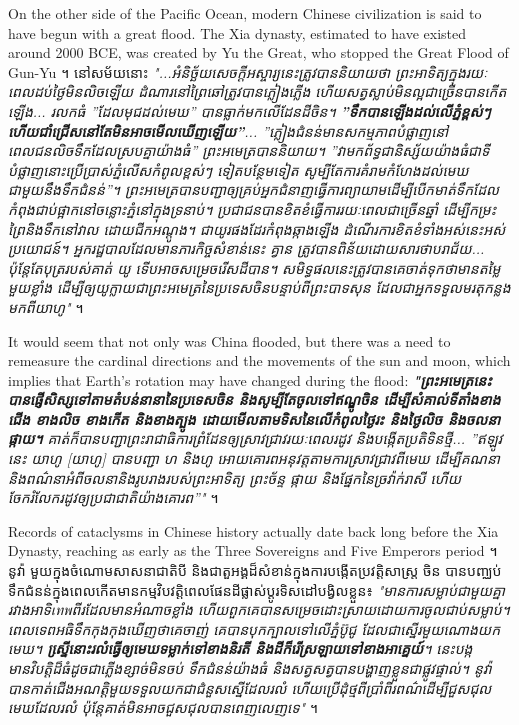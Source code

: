 \documentclass[10pt,twocolumn,letterpaper]{article}
\begin{document}
On the other side of the Pacific Ocean, modern Chinese civilization is said to have begun with a great flood. The Xia dynasty, estimated to have existed around 2000 BCE, was created by Yu the Great, who stopped the Great Flood of Gun-Yu \cite{6}។ នៅសម័យនោះ \textit{"...អំនិច្ឆ័យសេចក្ដីអស្ចារ្យនេះត្រូវបាននិយាយថា ព្រះអាទិត្យក្នុងរយៈពេលដប់ថ្ងៃមិនលិចឡើយ ដំណារ​នៅព្រៃឆៅត្រូវបានភ្លៀងភ្លើង ហើយសត្វស្លាប់មិនល្អជាច្រើនបានកើតឡើង... រលកធំ ''ដែលមុជដល់មេឃ'' បានធ្លាក់មកលើដែនដីចិន។ \textbf{''ទឹកបានឡើងដល់លើភ្នំខ្ពស់ៗ ហើយជាំជ្រើសនៅតែមិនអាចមើលឃើញឡើយ''}... ''ភ្លៀងជំនន់មានសកម្មភាពបំផ្លាញនៅពេលជនលិច​ទឹកដែលស្របគ្នាយ៉ាងធំ'' ព្រះអមេត្របាននិយាយ។ ''វាមកព័ទ្ធជានិស្ស័យយ៉ាងធំជាទីបំផ្លាញនោះប្រើប្រាស់ភ្នំលើសកំពូលខ្ពស់ៗ ទៀតបន្ថែមទៀត សូម្បីតែការគំរាមកំហែងដល់មេឃជាមួយនឹងទឹកជំនន់''។ ព្រះអមេត្របានបញ្ជាឲ្យគ្រប់អ្នកជំនាញធ្វើការព្យាយាមដើម្បីបើកមាត់ទឹកដែលកំពុងជាប់ផ្អាកនៅចន្លោះភ្នំនៅក្នុងទ្រនាប់។ ប្រជាជនបានខិតខំធ្វើការរយៈពេលជាច្រើនឆ្នាំ ដើម្បីកម្រះព្រៃនិងទឹកនៅវាល ដោយជីកអណ្តូង។ ជាយូរផងដែរកំពុងឆ្កាងឡើង ដំណើរការខិតខំទាំងអស់នេះអស់ប្រយោជន៍។ អ្នករដ្ឋបាលដែលមានភារកិច្ចសំខាន់នេះ គ្វាន ត្រូវបានពិន័យដោយសារថា​បរាជ័យ... ប៉ុន្តែតែបុត្ររបស់គាត់ យូ ទើបអាចសម្រេចរើសដីបាន។ សមិទ្ធផលនេះត្រូវបានគេចាត់ទុកថាមានតម្លៃមួយខ្លាំង ដើម្បីឲ្យយូក្លាយជាព្រះអមេត្រនៃប្រទេសចិនបន្ទាប់ពីព្រះបាទសុន ដែលជាអ្នកទទួលមរតុកន្លងមកពីយាហូ"} \cite{5}។

It would seem that not only was China flooded, but there was a need to remeasure the cardinal directions and the movements of the sun and moon, which implies that Earth's rotation may have changed during the flood: \textit{\textbf{"ព្រះអមេត្រនេះបានផ្ញើសិស្សទៅតាមតំបន់នានានៃប្រទេសចិន និងសូម្បីតែចូលទៅឥណ្ឌូចិន ដើម្បីសំគាល់ទីតាំងខាងជើង ខាងលិច ខាងកើត និងខាងត្បូង ដោយមើលតាមទិសនៃលើកំពូលថ្ងៃរះ និងថ្ងៃលិច និងចលនាផ្កាយ។} គាត់ក៏បានបញ្ជាព្រះរាជាធិការព្រំដែនឲ្យស្រាវជ្រាវរយៈពេលរដូវ និងបង្កើតប្រតិទិនថ្មី... ''ឥឡូវនេះ យាហូ [យាហូ] បានបញ្ជា ហ និងហូ អោយគោរពអនុវត្តតាមការស្រាវជ្រាវពីមេឃ ដើម្បីគណនានិងពណ៌នាអំពីចលនានិងរូបរាងរបស់ព្រះអាទិត្យ ព្រះច័ន្ទ ផ្កាយ និងផ្នែកនៃច្រវ៉ាក់រាសី ហើយចែករំលែករដូវឲ្យប្រជាជាតិយ៉ាងគោរព''"} \cite{5}។

Records of cataclysms in Chinese history actually date back long before the Xia Dynasty, reaching as early as the Three Sovereigns and Five Emperors period \cite{7}។ នូវ៉ា មួយក្នុងចំណោមសាសនាជាតិបី និងជាតួអង្គដ៏សំខាន់ក្នុងការបង្កើតប្រវត្តិសាស្ត្រ ចិន បានបញ្ឈប់ទឹកជំនន់ក្នុងពេលកើតមានកម្មវិបវត្តិពេលផែនដីផ្លាស់ប្ដូរទិសដៅបង្វិលខ្លួន៖ \textit{"មានការសម្លាប់ជាមួយគ្នារវាងអាទិเทพពីរដែលមានអំណាចខ្លាំង ហើយពួកគេបានសម្រេចដោះស្រាយដោយការចូលជាប់សម្លាប់។ ពេលទេពអធិទឹកកុងកុងឃើញថា​គេចាញ់ គេបានបុកក្បាលទៅលើភ្នំប៊ូជូ ដែលជាស្នើរមួយណោងយកមេឃ។ \textbf{ស្នើ្រនោះរលំធ្វើឲ្យមេឃទម្លាក់ទៅខាងនិរតី និងដីក៏រើស្រឡាយទៅខាងអាគ្នេយ៍}។ នេះបង្កមានវិបត្តិដ៏ធំដូចជាភ្លើងខ្សាច់មិនចប់ ទឹកជំនន់យ៉ាងធំ និងសត្វសត្វបានបង្ហាញខ្លួនជាផ្លូវផ្ទាល់។ នូវ៉ា បានកាត់ជើងអណត្តិមួយទទួលយកជាជំនួសស្នើដែលរលំ ហើយប្រើដុំថ្មពីប្រាំពីរពណ៌ដើម្បីជួសជុលមេឃដែលរលំ ប៉ុន្តែគាត់មិនអាចជួសជុលបានពេញលេញទេ"} \cite{8}។
\end{document}
